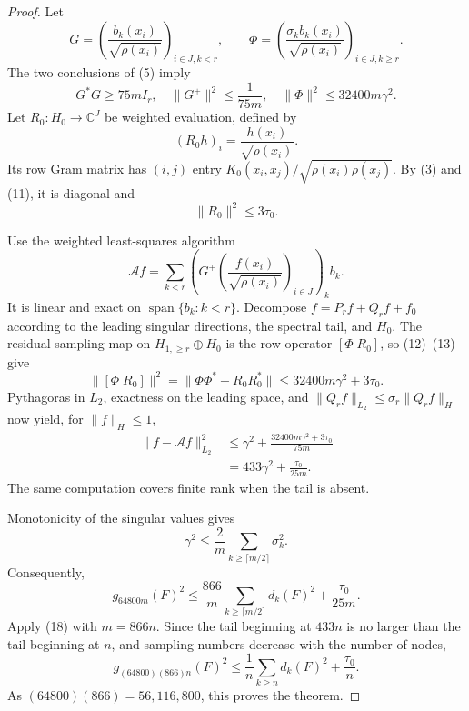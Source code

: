 \documentclass[10pt]{article}
\newcommand{\C}{\mathbb C}
\newcommand{\Span}{\operatorname{span}}
\begin{document}
\begin{proof}
Let
\[
 G=\left(\frac{b_k(x_i)}{\sqrt{\rho(x_i)}}\right)_{i\in J,k<r},
 \qquad
 \Phi=\left(\frac{\sigma_kb_k(x_i)}{\sqrt{\rho(x_i)}}
       \right)_{i\in J,k\geq r}.
\]
The two conclusions of (5) imply
\[
 G^*G\geq75mI_r,
 \quad \|G^+\|^2\leq\frac1{75m},
 \quad \|\Phi\|^2\leq32400m\gamma^2.                       \tag{12}
\]
Let $R_0:H_0\to\C^J$ be weighted evaluation, defined by
\[
 (R_0h)_i=\frac{h(x_i)}{\sqrt{\rho(x_i)}}.
\]
Its row Gram matrix has $(i,j)$ entry
$K_0(x_i,x_j)/\sqrt{\rho(x_i)\rho(x_j)}$.  By (3) and (11), it is diagonal
and
\[
 \|R_0\|^2\leq3\tau_0.                                      \tag{13}
\]

Use the weighted least-squares algorithm
\[
 \mathcal A f
 =\sum_{k<r}\left(G^+
   \left(\frac{f(x_i)}{\sqrt{\rho(x_i)}}\right)_{i\in J}
   \right)_k b_k.                                             \tag{14}
\]
It is linear and exact on $\Span\{b_k:k<r\}$.  Decompose
$f=P_rf+Q_rf+f_0$ according to the leading singular directions, the
spectral tail, and $H_0$.  The residual sampling map on
$H_{1,\geq r}\oplus H_0$ is the row operator $[\Phi\;R_0]$, so (12)--(13)
give
\[
 \|[\Phi\;R_0]\|^2
 =\|\Phi\Phi^*+R_0R_0^*\|
 \leq32400m\gamma^2+3\tau_0.                                \tag{15}
\]
Pythagoras in $L_2$, exactness on the leading space, and
$\|Q_rf\|_{L_2}\leq\sigma_r\|Q_rf\|_H$ now yield, for
$\|f\|_H\leq1$,
\begin{align*}
 \|f-\mathcal Af\|_{L_2}^2
 &\leq \gamma^2
 +\frac{32400m\gamma^2+3\tau_0}{75m}\\
 &=433\gamma^2+\frac{\tau_0}{25m}.                            \tag{16}
\end{align*}
The same computation covers finite rank when the tail is absent.

Monotonicity of the singular values gives
\[
 \gamma^2\leq\frac2m
     \sum_{k\geq\lceil m/2\rceil}\sigma_k^2.                 \tag{17}
\]
Consequently,
\[
 g_{64800m}(F)^2
 \leq\frac{866}{m}\sum_{k\geq\lceil m/2\rceil}d_k(F)^2
      +\frac{\tau_0}{25m}.                                   \tag{18}
\]
Apply (18) with $m=866n$.  Since the tail beginning at $433n$ is no
larger than the tail beginning at $n$, and sampling numbers decrease with
the number of nodes,
\[
 g_{(64800)(866)n}(F)^2
 \leq\frac1n\sum_{k\geq n}d_k(F)^2+\frac{\tau_0}{n}.
\]
As $(64800)(866)=56{,}116{,}800$, this proves the theorem.
\end{proof}
\end{document}
